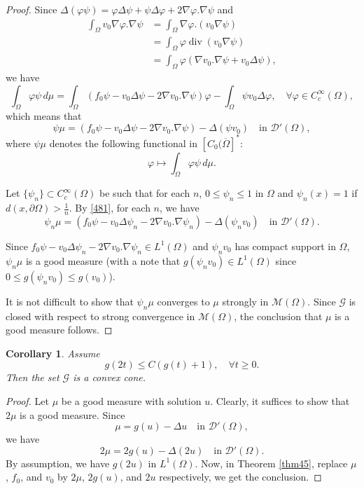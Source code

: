 \documentclass[a4paper, 11pt]{report}
\newtheorem{crr}{Corollary}[chapter]
\theoremstyle{definition}\newtheorem*{rmk}{Remark}
\DeclareMathOperator{\dive}{div}
\begin{document}
\begin{proof}
Since $\Delta (\varphi \psi)  = \varphi \Delta \psi + \psi \Delta \varphi + 2\nabla \varphi.\nabla \psi$ and
\begin{align*}
\int_{\Omega}v_0 \nabla \varphi. \nabla \psi &= \int_{\Omega} \nabla \varphi. (v_0\nabla \psi)\\
&= \int_{\Omega} \varphi \dive(v_0\nabla \psi)\\
&= \int_{\Omega} \varphi (\nabla v_0.\nabla \psi + v_0\Delta \psi),
\end{align*}
we have
\[
\int_{\Omega}\varphi \psi\,d\mu = \int_{\Omega}(f_0\psi - v_0\Delta \psi - 2\nabla v_0.\nabla\psi)\varphi - \int_{\Omega}\psi v_0 \Delta\varphi, \quad\forall\varphi \in C_c^{\infty}(\Omega),
\]
which means that
\begin{equation}\label{481}
\psi\mu = (f_0\psi - v_0\Delta\psi - 2\nabla v_0.\nabla\psi) - \Delta(\psi v_0) \quad\text{in } \mathcal{D}'(\Omega),
\end{equation}
where $\psi\mu$ denotes the following functional in $[C_0(\overline{\Omega}]^*$:
\[
\varphi \mapsto \int_{\Omega}\varphi\psi\,d\mu.
\]

Let $\{\psi_n\}\subset C_c^{\infty}(\Omega)$ be such that for each $n$, $0\leq \psi_n \leq 1$ in $\Omega$ and $\psi_n(x) = 1$ if $d(x,\partial \Omega)> \frac{1}{n}$. By \eqref{481}, for each $n$, we have
\[
\psi_n\mu = (f_0\psi - v_0\Delta\psi_n - 2\nabla v_0.\nabla\psi_n) - \Delta(\psi_n v_0) \quad\text{in } \mathcal{D}'(\Omega).
\]

Since $f_0\psi - v_0\Delta\psi_n - 2\nabla v_0.\nabla\psi_n \in L^1(\Omega)$ and $\psi_n v_0$ has compact support in $\Omega$, $\psi_n\mu$ is a good measure (with a note that $g(\psi_n v_0) \in L^1(\Omega)$ since $0\leq g(\psi_n v_0)\leq g(v_0)$).

It is not difficult to show that $\psi_n\mu$ converges to $\mu$ strongly in $\mathcal{M}(\Omega)$. Since $\mathcal{G}$ is closed with respect to strong convergence in $\mathcal{M}(\Omega)$, the conclusion that $\mu$ is a good measure follows. 
\end{proof}

\begin{crr}
Assume
\[
g(2t) \le C(g(t) +1), \quad \forall t\ge 0.
\]
Then the set $\mathcal{G}$ is a convex cone.
\end{crr}

\begin{proof}
Let $\mu$ be a good measure with solution $u$. Clearly, it suffices to show that $2\mu$ is a good measure. Since
\[
\mu = g(u) - \Delta u \quad\text{in }\mathcal{D}'(\Omega),
\]
we have
\[
2\mu = 2g(u) - \Delta(2u) \quad\text{in }\mathcal{D}'(\Omega).
\]
By assumption, we have $g(2u)$ in $L^1(\Omega)$. Now, in Theorem \ref{thm45}, replace $\mu$, $f_0$, and $v_0$ by $2\mu$, $2g(u)$, and $2u$ respectively, we get the conclusion.
\end{proof}
\end{document}
